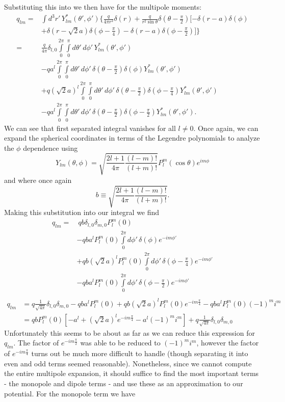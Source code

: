 \documentclass[11pt,letterpaper]{article}
\begin{document}
\begin{enumerate}
\begin{enumerate}[label=\Roman*.]
Substituting this into we then have for the multipole moments:
\begin{align*}q_{lm} =& \int{d^3r'\,Y^*_{lm}(\theta',\phi')\{\frac{q}{4\pi r^2}\delta(r)+\frac{q}{r^2\sin\theta}\delta(\theta-\frac{\pi}{2})[-\delta(r-a)\delta(\phi)}\\&+ \delta(r-\sqrt 2 a)\delta(\phi-\frac{\pi}{4})-\delta(r-a)\delta(\phi-\frac{\pi}{2})]\}\\
=&\frac{q}{4\pi}\delta_{l,0}\int\limits_0^{2\pi}\int\limits_0^\pi d\theta'\,d\phi'\,Y^*_{lm}(\theta',\phi')\\
&-qa^l\int\limits_0^{2\pi}\int\limits_0^\pi d\theta'\,d\phi'\,\delta(\theta-\frac{\pi}{2})\delta(\phi)Y^*_{lm}(\theta',\phi')\\
&+q(\sqrt 2 a)^l\int\limits_0^{2\pi}\int\limits_0^\pi d\theta'\,d\phi'\,\delta(\theta-\frac{\pi}{2})\delta(\phi-\frac{\pi}{4})Y^*_{lm}(\theta',\phi')\\
&-qa^l\int\limits_0^{2\pi}\int\limits_0^\pi d\theta'\,d\phi'\,\delta(\theta-\frac{\pi}{2})\delta(\phi-\frac{\pi}{2})Y^*_{lm}(\theta',\phi').
\end{align*}
We can see that first separated integral vanishes for all $l\ne0$. Once again, we can expand the spherical coordinates in terms of the Legendre polynomials to analyze the $\phi$ dependence using
$$Y_{lm}(\theta,\phi) = \sqrt{\frac{2l+1}{4\pi}\frac{(l-m)!}{(l+m)!}}P_l^m(\cos\theta)e^{im\phi} $$
and where once again
$$b\equiv \sqrt{\frac{2l+1}{4\pi}\frac{(l-m)!}{(l+m)!}}.$$
Making this substitution into our integral we find
\begin{align*}q_{lm}=& \ qb\delta_{l,0}\delta_{m,0}P_l^m(0)\\
&-qba^lP_l^m(0)\int\limits_0^{2\pi}d\phi'\,\delta(\phi)e^{-im\phi'}\\
&+qb(\sqrt 2a)^lP_l^m(0)\int\limits_0^{2\pi}d\phi'\,\delta(\phi-\frac{\pi}{4})e^{-im\phi'}\\
&-qba^lP_l^m(0)\int\limits_0^{2\pi}d\phi'\,\delta(\phi-\frac{\pi}{2})e^{-im\phi'}\\
\end{align*}
\begin{align*}q_{lm}&= q\frac{1}{\sqrt{4\pi}}\delta_{l,0}\delta_{m,0}-qba^lP_l^m(0)+qb(\sqrt 2a)^lP_l^m(0)e^{-im\frac{\pi}{4}}-qba^lP_l^m(0)(-1)^mi^m\\
&=qbP_l^m(0)[-a^l+(\sqrt 2 a)^le^{-im\frac{\pi}{4}}-a^l(-1)^mi^m]+q\frac{1}{\sqrt{4\pi}}\delta_{l,0}\delta_{m,0}
\end{align*}
Unfortunately this seems to be about as far as we can reduce this expression for $q_{lm}$. The factor of $e^{-im\frac{\pi}{2}}$ was able to be reduced to $(-1)^mi^m$, however the factor of $e^{-im\frac{\pi}{4}}$ turns out be much more difficult to handle (though separating it into even and odd terms seemed reasonable). Nonetheless, since we cannot compute the entire multipole expansion, it should suffice to find the most important terms - the monopole and dipole terms - and use these as an approximation to our potential. For the monopole term we have

\end{enumerate}
\end{enumerate}
\end{document}
